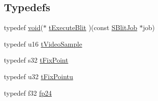 \subsection*{Typedefs}
\begin{DoxyCompactItemize}
\item 
typedef \hyperlink{wglext_8h_a9e6b7f1933461ef318bb000d6bd13b83}{void}($\ast$ \hyperlink{namespaceirr_a0884da614eab7ae475c55550c2f97bd0}{t\-Execute\-Blit} )(const \hyperlink{structirr_1_1_s_blit_job}{S\-Blit\-Job} $\ast$job)
\item 
typedef u16 \hyperlink{namespaceirr_ab51ec14fc2884a414e9fb5a2ca6f03da}{t\-Video\-Sample}
\item 
typedef s32 \hyperlink{namespaceirr_a705cfbd95ac6f0e531f1b341af6fae39}{t\-Fix\-Point}
\item 
typedef u32 \hyperlink{namespaceirr_abd8e4c96433c2eecb4b48987f9cd7859}{t\-Fix\-Pointu}
\item 
typedef f32 \hyperlink{namespaceirr_aebc1099fc704ff027ddbc3cc7231d9c2}{fp24}
\end{DoxyCompactItemize}
